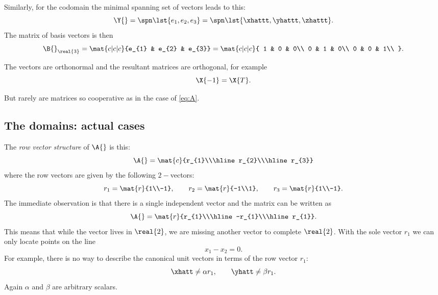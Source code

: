 Similarly, for the codomain the minimal spanning set of vectors leads to this:
\begin{equation}
  \Y{} = \spn \lst{e_{1},e_{2},e_{3}} = \spn \lst{\xhattt,\yhattt,\zhattt}.
\end{equation}
The matrix of basis vectors is then
\begin{equation}
  \B{}_{\real{3}} = \mat{c|c|c}{e_{1} & e_{2} & e_{3}} = \mat{c|c|c}
  {
  1 & 0 & 0\\
  0 & 1 & 0\\
  0 & 0 & 1\\
  }.
\end{equation}

The vectors are orthonormal and the resultant matrices are orthogonal, for example
\begin{equation}
  \X{-1} = \X{T}.
\end{equation}

But rarely are matrices so cooperative as in the case of \eqref{eq:A}.

\subsection{The domains: actual cases}
The \textit{row vector structure} of $\A{}$ is this:
\begin{equation}
  \A{}=\mat{c}{r_{1}\\\hline r_{2}\\\hline r_{3}}
\end{equation}
where the row vectors are given by the following $2-$vectors:
\begin{equation}
  r_{1}=\mat{r}{1\\-1}, \qquad r_{2}=\mat{r}{-1\\1}, \qquad r_{3}=\mat{r}{1\\-1}.
\end{equation}
The immediate observation is that there is a single independent vector and the matrix can be written as
\begin{equation}
  \A{}=\mat{r}{r_{1}\\\hline-r_{1}\\\hline r_{1}}.
\end{equation}
This means that while the vector lives in $\real{2}$, we are missing another vector to complete  $\real{2}$. With the sole vector $r_{1}$ we can only locate points on the line 
\begin{equation}
x_{1}-x_{2}=0.
\end{equation}
For example, there is no way to describe the canonical unit vectors in terms of the row vector $r_{1}$:
\begin{equation}
  \xhatt \ne \alpha r_{1}, \qquad \yhatt \ne \beta r_{1}.
\end{equation}
Again $\alpha$ and $\beta$ are arbitrary scalars.

